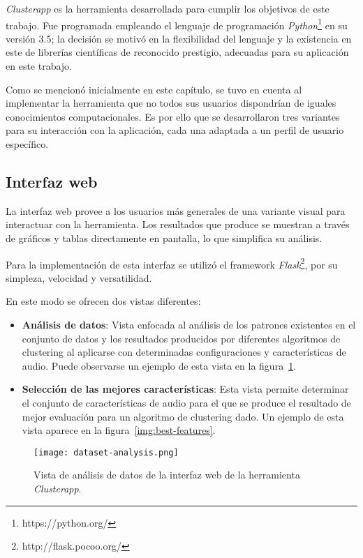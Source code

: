 \textit{Clusterapp} es la herramienta desarrollada para cumplir los objetivos de este trabajo.
Fue programada empleando el lenguaje de programación \textit{Python}\footnote{https://python.org/} en su versión 3.5;
la decisión se motivó en la flexibilidad del lenguaje y la existencia en este de librerías científicas de reconocido prestigio, adecuadas para su aplicación en este trabajo.

Como se mencionó inicialmente en este capítulo, se tuvo en cuenta al implementar la herramienta que no todos sus usuarios dispondrían de iguales conocimientos computacionales.
Es por ello que se desarrollaron tres variantes para su interacción con la aplicación, cada una adaptada a un perfil de usuario específico.

\subsection{Interfaz web}\label{subsec:interfazWeb}

La interfaz web provee a los usuarios más generales de una variante visual para interactuar con la herramienta.
Los resultados que produce se muestran a través de gráficos y tablas directamente en pantalla, lo que simplifica su análisis.

Para la implementación de esta interfaz se utilizó el framework \textit{Flask}\footnote{http://flask.pocoo.org/}, por su simpleza, velocidad y versatilidad.

En este modo se ofrecen dos vistas diferentes:

\begin{itemize}
    \item \textbf{Análisis de datos}: Vista enfocada al análisis de los patrones existentes en el conjunto de datos y los resultados producidos por diferentes algoritmos de clustering al aplicarse con determinadas configuraciones y características de audio. Puede observarse un ejemplo de esta vista en la figura~\ref{img:dataset-analysis}.
    \item \textbf{Selección de las mejores características}: Esta vista permite determinar el conjunto de características de audio para el que se produce el resultado de mejor evaluación para un algoritmo de clustering dado. Un ejemplo de esta vista aparece en la figura~\ref{img:best-features}.
\end{itemize}

\begin{figure}[!h]
    \centering
    \texttt{[image: dataset-analysis.png]}
    \caption{Vista de análisis de datos de la interfaz web de la herramienta \textit{Clusterapp}.}
    \label{img:dataset-analysis}
\end{figure}

